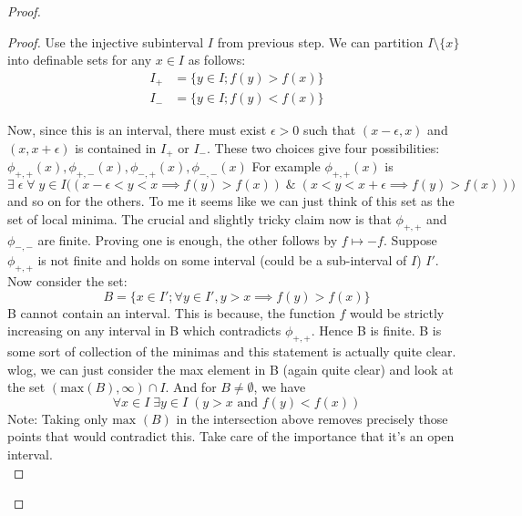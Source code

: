 \begin{proof}
\begin{proof}
        Use the injective subinterval $I$ from previous step. We can partition $I \setminus \{x\}$ into definable sets for any $x\in I$ as follows:
        \begin{align*}
            I_+ &= \{y\in I; f(y) > f(x)\} \\
            I_- &= \{y\in I; f(y) < f(x)\}
        \end{align*}

        Now, since this is an interval, there must exist $\epsilon > 0$ such that $(x-\epsilon, x)$ and $(x, x+\epsilon)$ is contained in $I_+$ or $I_-$. 
        These two choices give four possibilities: $\phi_{+,+}(x), \phi_{+,-}(x), \phi_{-,+}(x), \phi_{-,-}(x)$
        For example $\phi_{+,+}(x)$ is
        \begin{equation*}
            \exists\; \epsilon\; \forall \;y \in I \Big( (x-\epsilon<y<x\implies f(y)>f(x)) \; \& \; (x<y<x+\epsilon\implies f(y)>f(x)) \Big)
        \end{equation*} and so on for the others. 
        To me it seems like we can just think of this set as the set of local minima.
        The crucial and slightly tricky claim now is that $\phi_{+,+}$ and $\phi_{-,-}$ are finite. Proving one is enough, the other follows by $f\mapsto -f$.
        Suppose $\phi_{+,+}$ is not finite and holds on some interval (could be a sub-interval of $I$) $I'$. Now consider the set:
        \begin{equation*}
            B = \{x\in I';\forall y\in I', y>x\implies f(y) > f(x)\}
        \end{equation*}
        B cannot contain an interval. This is because, the function $f$ would be strictly increasing on any interval in B which contradicts $\phi_{+,+}$. Hence B is finite. B is some sort of collection of the minimas and this statement is actually quite clear.
        \\ wlog, we can just consider the max element in B (again quite clear) and look at the set \newline $(\text{max}(B), \infty)\cap I$. And for $B\neq\emptyset$, we have
        \begin{equation}
        \label{prop}
            \forall x \in I\;\exists y\in I \;(y>x \text{ and } f(y) < f(x))
        \end{equation}
        Note: Taking only $\text{max }(B)$ in the intersection above removes precisely those points that would contradict this. Take care of the importance that it's an open interval.
        \begin{equation*}

\end{equation*}
\end{proof}
\end{proof}
